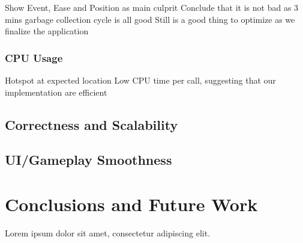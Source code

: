 \documentclass[conference]{IEEEtran}
\begin{document}
Show Event, Ease and Position as main culprit
Conclude that it is not bad as 3 mins garbage collection cycle is all good
Still is a good thing to optimize as we finalize the application

\subsubsection{CPU Usage}


Hotspot at expected location
Low CPU time per call, suggesting that our implementation are efficient



\subsection{Correctness and Scalability}

\subsection{UI/Gameplay Smoothness}


\section{Conclusions and Future Work}
\label{sec:conclusions}

Lorem ipsum dolor sit amet, consectetur adipiscing elit.
\end{document}
